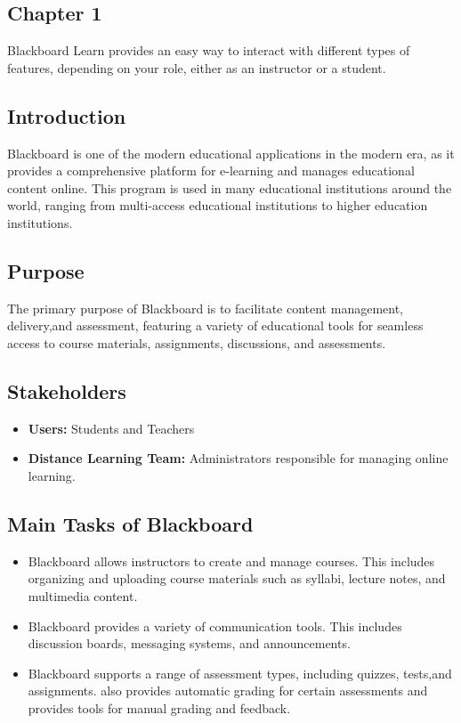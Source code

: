 \documentclass[a4paper,12pt]{article}
\begin{document}
\tableofcontents{}

\newpage 

\begin{center}
\vspace*{10cm} 
\section{Chapter 1}
\end{center}



\newpage
Blackboard Learn provides an easy way to interact with different types of features,
depending on your role, either as an instructor or a student.
\subsection{Introduction}
Blackboard is one of the modern educational applications in the modern era, as
it provides a comprehensive platform for e-learning and manages educational
content online. This program is used in many educational institutions around the world, ranging from multi-access educational institutions to higher
education institutions.


\subsection{Purpose}
The primary purpose of Blackboard is to facilitate content management, delivery,and assessment, featuring a variety of educational tools for seamless access to course materials, assignments, discussions, and assessments.

\subsection{Stakeholders}
\begin{itemize}
    \item \textbf{Users:} Students and Teachers
    \item \textbf{Distance Learning Team:} Administrators responsible for managing online learning.
\end{itemize}


\subsection{Main Tasks of Blackboard}
\begin{itemize}
    \item Blackboard allows instructors to create and manage courses. This includes organizing and uploading course materials such as syllabi, lecture notes, and multimedia content. 
    \item Blackboard provides a variety of communication tools. This includes
discussion boards, messaging systems, and announcements. 
    \item Blackboard supports a range of assessment types, including quizzes, tests,and assignments. also provides automatic grading for certain assessments and provides tools for manual grading and feedback.
\end{itemize}
\end{document}
